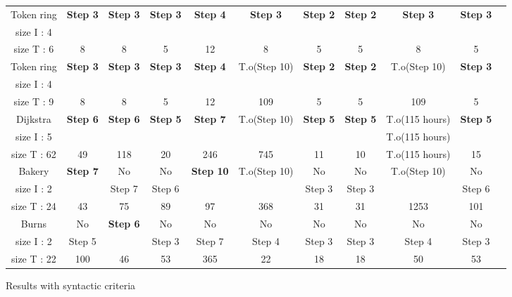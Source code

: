 \documentclass[]{llncs}
\begin{document}
\begin{figure}[tb]
\begin{bigcenter}
\begin{scriptsize}
\begin{tabular}{|c|c|c|c|c|c|c|c|c|c|c|}
\hline
			&			&			&			&			&				&				&				&				&		\\
\hline
Token ring		&	\textbf{Step 3}			&	\textbf{Step 3}			&	\textbf{Step 3}			&	\textbf{Step 4}			&	\textbf{Step 3}	&	\textbf{Step 2}	&	\textbf{Step 2}	&	\textbf{Step 3}	&	\textbf{Step 3}	\\
size I : 4		&		&		&		& 		&			&			&			&			&			\\
size T : 6		&	8					&	8					&	5					&	12					&	8				&	5				&	5				&	8				&	5				\\
\hline
Token ring		&	\textbf{Step 3}			&	\textbf{Step 3}			&	\textbf{Step 3}			&	\textbf{Step 4}			&	T.o(Step 10)		&	\textbf{Step 2}	&	\textbf{Step 2}	&	T.o(Step 10)		&	\textbf{Step 3}	\\
size I : 4		&		&		&		& 		&					&			&			&					&			\\
size T : 9		&	8					&	8					&	5					&	12					&	109				&	5				&	5				&	109				&	5				\\
\hline
Dijkstra		&	\textbf{Step 6}			&	\textbf{Step 6}			&	\textbf{Step 5}			&	\textbf{Step 7}			&	T.o(Step 10)		&	\textbf{Step 5}	&	\textbf{Step 5}	&	T.o(115 hours)		&	\textbf{Step 5}	\\
size I : 5		&		&		&		&		&					&			&			&	T.o(115 hours)		&			\\	
size T : 62		&	49					&	118					&	20					&	246					&	745				&	11				&	10				&	T.o(115 hours)		&	15				\\	
\hline
Bakery		&	\textbf{Step 7}			&	No					&	No					&	\textbf{Step 10}			&	T.o(Step 10)		&	No				&	No				&	T.o(Step 10)		&	No				\\
size I : 2		&		&	Step 7				&	Step 6				&		&					&	Step 3			&	Step 3			&					&	Step 6			\\
size T : 24		&	43					&	75					&	89					&	97					&	368				&	31				&	31				&	1253			&	101				\\	
\hline
Burns		&	No					&	\textbf{Step 6}			&	No					&	No					&	No				&	No				&	No				&	No				&	No				\\
size I : 2		&	Step 5				&		&	Step 3				&	Step 7				&	Step 4			&	Step 3			&	Step 3			&	Step 4			&	Step 3			\\	
size T : 22		&	100					&	46					&	53					&	365					&	22				&	18				&	18				&	50				&	53				\\	
\hline
\end{tabular}
\end{scriptsize}
\caption{Results with syntactic criteria}
\label{tableau_resultats_master}
\end{bigcenter}
\end{figure}
\end{document}
